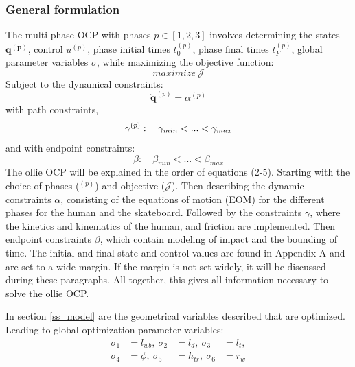 \documentclass[default,iicol]{sn-jnl}
\theoremstyle{thmstyleone}%
\theoremstyle{thmstyletwo}%
\theoremstyle{thmstylethree}%
\begin{document}
\subsubsection{General formulation}
The multi-phase OCP with phases $p \in [1,2,3]$ involves determining the states $\mathbf{q^{(p)}}$, control $u^{(p)}$, phase initial times $t_0^{(p)}$, phase final times $t_F^{(p)}$, global parameter variables $\sigma$, while maximizing the objective function:
\begin{equation}
    maximize\ \mathcal{J}
\end{equation} 
Subject to the dynamical constraints:
\begin{equation}
\ddot{\mathbf{q}}^{(p)}=\alpha^{(p)}
\end{equation}
with path constraints,
\begin{equation}
        \gamma^{(p)}:\quad \gamma_{min} < ... < \gamma_{max}\\
\end{equation}
and with endpoint constraints:
\begin{equation}
    \beta:\quad \beta_{min} < ... < \beta_{max}
\end{equation}
The ollie OCP will be explained in the order of equations (2-5). Starting with the choice of phases ($^{(p)}$) and objective ($\mathcal{J}$). Then describing the dynamic constraints $\alpha$, consisting of the equations of motion (EOM) for the different phases for the human and the skateboard. Followed by the constraints $\gamma$, where the kinetics and kinematics of the human, and friction are implemented. Then endpoint constraints $\beta$, which contain modeling of impact and the bounding of time. The initial and final state and control values are found in Appendix A and are set to a wide margin. If the margin is not set widely, it will be discussed during these paragraphs. All together, this gives all information necessary to solve the ollie OCP. %

In section \ref{ss_model} are the geometrical variables described that are optimized. Leading to global optimization parameter variables:
\begin{equation}
\begin{array}{rlrl}
    \sigma_{1} &= l_{wb},\ \sigma_{2} &= l_d,\ \sigma_{3} &= l_t,   \\ 
    \sigma_{4} &= \phi,\ \sigma_{5} &= h_{tr},\  \sigma_{6} &= r_w 
\end{array}
\end{equation}
\end{document}
